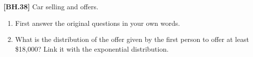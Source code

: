 \begin{exercise}
	\textbf{[BH.38]} Car selling and offers.
	\begin{enumerate}
		\item First answer the original questions in your own words. 
		\item What is the distribution of the offer given by the  first person to offer at least \$18,000? Link it with the exponential distribution. 
	\end{enumerate} 
\end{exercise}
